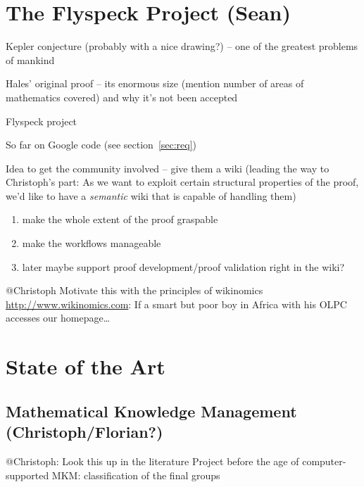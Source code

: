 \documentclass{llncs}
\begin{document}
\section{The Flyspeck Project (Sean)}
\label{sec:flyspeck}

Kepler conjecture (probably with a nice drawing?) -- one of the greatest problems of
mankind

Hales' original proof -- its enormous size (mention number of areas of mathematics
covered) and why it's not been accepted

Flyspeck project\cite{hales:DSP:2006:432}

So far on Google code (see section~\ref{sec:req})

Idea to get the community involved -- give them a wiki (leading the way to Christoph's
part: As we want to exploit certain structural properties of the proof, we'd like to have
a \emph{semantic} wiki that is capable of handling them)

\begin{enumerate}
\item make the whole extent of the proof graspable
\item make the workflows manageable
\item later maybe support proof development/proof validation right in the
  wiki?
\end{enumerate}

\begin{todo}{@Christoph}
  Motivate this with the principles of wikinomics \url{http://www.wikinomics.com}: If a
  smart but poor boy in Africa with his OLPC accesses our homepage\ldots
\end{todo}

\section{State of the Art}
\label{sec:sota}

\subsection{Mathematical Knowledge Management (Christoph/Florian?)}
\label{sec:mkm}

\begin{todo}{@Christoph: Look this up in the literature}
Project before the age of computer-supported MKM: classification of the final groups
\end{todo}
\end{document}
